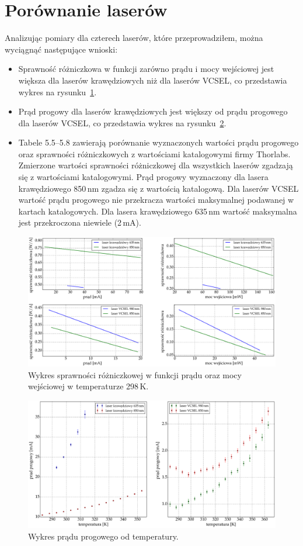 \section{Porównanie laserów}
Analizując pomiary dla czterech laserów, które przeprowadziłem, można wyciągnąć następujące wnioski:
\begin{itemize}
\item Sprawność różniczkowa w funkcji zarówno prądu i mocy wejściowej jest większa dla laserów krawędziowych niż dla laserów
VCSEL, co przedstawia wykres na rysunku~\ref{fig:plot_eff}.
\item Prąd progowy dla laserów krawędziowych jest większy od prądu progowego dla laserów VCSEL, co przedstawia wykres
na rysunku~\ref{fig:plot_temp_i_th}.
\item Tabele 5.5--5.8 zawierają porównanie wyznaczonych wartości prądu progowego oraz sprawności różniczkowych z wartościami katalogowymi
firmy Thorlabs. Zmierzone wartości sprawności różniczkowej dla wszystkich laserów zgadzają się z wartościami katalogowymi.
Prąd progowy wyznaczony dla lasera krawędziowego 850\,nm zgadza się z wartością katalogową.
Dla laserów VCSEL wartość prądu progowego nie przekracza wartości maksymalnej podawanej w kartach katalogowych.
Dla lasera krawędziowego 635\,nm wartość maksymalna jest przekroczona niewiele (2\,mA).
\end{itemize}
\newpage
\begin{figure}
\center
  \includegraphics[scale=0.30]{plot_common/plot_eff.eps}
  \caption{Wykres sprawności różniczkowej w funkcji prądu oraz mocy wejściowej w temperaturze 298\,K.}
  \label{fig:plot_eff}
\end{figure}
\begin{figure}[H]
\center
  \includegraphics[scale=0.30]{plot_common/plot_temp_i_th.eps}
  \caption{Wykres prądu progowego od temperatury.}
  \label{fig:plot_temp_i_th}
\end{figure}
